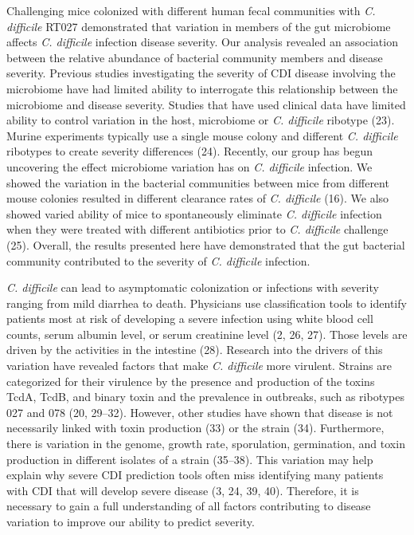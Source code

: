 \documentclass[
  12pt,
]{article}
\begin{document}
Challenging mice colonized with different human fecal communities with
\emph{C. difficile} RT027 demonstrated that variation in members of the
gut microbiome affects \emph{C. difficile} infection disease severity.
Our analysis revealed an association between the relative abundance of
bacterial community members and disease severity. Previous studies
investigating the severity of CDI disease involving the microbiome have
had limited ability to interrogate this relationship between the
microbiome and disease severity. Studies that have used clinical data
have limited ability to control variation in the host, microbiome or
\emph{C. difficile} ribotype (23). Murine experiments typically use a
single mouse colony and different \emph{C. difficile} ribotypes to
create severity differences (24). Recently, our group has begun
uncovering the effect microbiome variation has on \emph{C. difficile}
infection. We showed the variation in the bacterial communities between
mice from different mouse colonies resulted in different clearance rates
of \emph{C. difficile} (16). We also showed varied ability of mice to
spontaneously eliminate \emph{C. difficile} infection when they were
treated with different antibiotics prior to \emph{C. difficile}
challenge (25). Overall, the results presented here have demonstrated
that the gut bacterial community contributed to the severity of \emph{C.
difficile} infection.

\emph{C. difficile} can lead to asymptomatic colonization or infections
with severity ranging from mild diarrhea to death. Physicians use
classification tools to identify patients most at risk of developing a
severe infection using white blood cell counts, serum albumin level, or
serum creatinine level (2, 26, 27). Those levels are driven by the
activities in the intestine (28). Research into the drivers of this
variation have revealed factors that make \emph{C. difficile} more
virulent. Strains are categorized for their virulence by the presence
and production of the toxins TcdA, TcdB, and binary toxin and the
prevalence in outbreaks, such as ribotypes 027 and 078 (20, 29--32).
However, other studies have shown that disease is not necessarily linked
with toxin production (33) or the strain (34). Furthermore, there is
variation in the genome, growth rate, sporulation, germination, and
toxin production in different isolates of a strain (35--38). This
variation may help explain why severe CDI prediction tools often miss
identifying many patients with CDI that will develop severe disease (3,
24, 39, 40). Therefore, it is necessary to gain a full understanding of
all factors contributing to disease variation to improve our ability to
predict severity.
\end{document}
